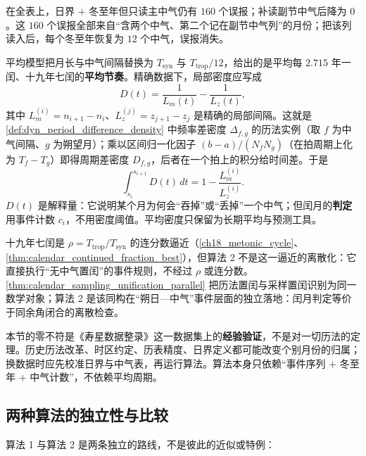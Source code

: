 在全表上，日界 \(+\) 冬至年但只读主中气仍有 \(160\) 个误报；补读副节中气后降为 \(0\)。这 \(160\) 个误报全部来自“含两个中气、第二个记在副节中气列”的月份；把该列读入后，每个冬至年恢复为 \(12\) 个中气，误报消失。

\begin{remark}[与平均周期密度的关系]
\label{rem:exact_vs_mean_density}
平均模型把月长与中气间隔替换为 \(T_{\text{syn}}\) 与 \(T_{\text{trop}}/12\)，给出的是平均每 \(2.715\) 年一闰、十九年七闰的\textbf{平均节奏}。精确数据下，局部密度应写成
\[
D(t)=\frac{1}{L_m(t)}-\frac{1}{L_z(t)},
\]
其中 \(L_m^{(i)}=n_{i+1}-n_i\)、\(L_z^{(j)}=z_{j+1}-z_j\) 是精确的局部间隔。这就是 \cref{def:dyn_period_difference_density} 中频率差密度 \(\Delta_{f,g}\) 的历法实例（取 \(f\) 为中气间隔、\(g\) 为朔望月）；乘以区间归一化因子 \((b-a)/(N_fN_g)\)（在拍周期上化为 \(T_f-T_g\)）即得周期差密度 \(D_{f,g}\)，后者在一个拍上的积分给时间差。于是
\[
\int_{s_i}^{s_{i+1}}D(t)\,dt
=1-\frac{L_m^{(i)}}{L_z^{(i)}}.
\]
\(D(t)\) 是解释量：它说明某个月为何会“吞掉”或“丢掉”一个中气；但闰月的\textbf{判定}用事件计数 \(c_i\)，不用密度阈值。平均密度只保留为长期平均与预测工具。
\end{remark}

\begin{remark}[与离散采样章的关系]
\label{rem:exact_intercalation_sampling}
十九年七闰是 \(\rho=T_{\text{trop}}/T_{\text{syn}}\) 的连分数逼近（\cref{ch18_metonic_cycle}、\cref{thm:calendar_continued_fraction_best}），但算法 2 不是这一逼近的离散化：它直接执行“无中气置闰”的事件规则，不经过 \(\rho\) 或连分数。\cref{thm:calendar_sampling_unification_parallel} 把历法置闰与采样置闰识别为同一数学对象；算法 2 是该同构在“朔日—中气”事件层面的独立落地：闰月判定等价于同余角闭合的离散检查。
\end{remark}

\begin{remark}[验证范围]
\label{rem:exact_intercalation_scope}
本节的零不符是《寿星数据整录》这一数据集上的\textbf{经验验证}，不是对一切历法的定理。历史历法改革、时区约定、历表精度、日界定义都可能改变个别月份的归属；换数据时应先校准日界与中气表，再运行算法。算法本身只依赖“事件序列 \(+\) 冬至年 \(+\) 中气计数”，不依赖平均周期。
\end{remark}

\subsection{两种算法的独立性与比较}
\label{subsec:two_intercalation_algorithms_comparison}

算法 1 与算法 2 是两条独立的路线，不是彼此的近似或特例：

